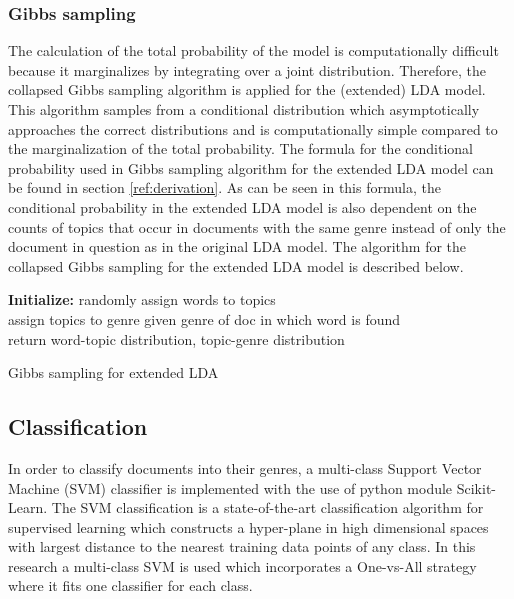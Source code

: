 \subsubsection{Gibbs sampling}
The calculation of the total probability of the model is computationally difficult because it marginalizes by integrating over a joint distribution. Therefore, the collapsed Gibbs sampling algorithm is applied for the (extended) LDA model. This algorithm samples from a conditional distribution which asymptotically approaches the correct distributions and is computationally simple compared to the marginalization of the total probability. The formula for the conditional probability used in Gibbs sampling algorithm for the extended LDA model can be found in section \ref{ref:derivation}. As can be seen in this formula, the conditional probability in the extended LDA model is also dependent on the counts of topics that occur in documents with the same genre instead of only the document in question as in the original LDA model. The algorithm for the collapsed Gibbs sampling for the extended LDA model is described below.

\begin{mdframed}
\begin{algorithm}[H]\label{alg:ext-lda}
\textbf{Initialize:} randomly assign words to topics \\
 assign topics to genre given genre of doc in which word is found\\
 return word-topic distribution, topic-genre distribution
 \caption{Gibbs sampling for extended LDA}
\end{algorithm}
\end{mdframed}

\subsection{Classification}\label{sub:classification}
In order to classify documents into their genres, a multi-class Support Vector Machine (SVM) classifier is implemented with the use of python module Scikit-Learn\cite{scikit-learn}. The SVM classification is a state-of-the-art classification algorithm for supervised learning which constructs a hyper-plane in high dimensional spaces with largest distance to the nearest training data points of any class. In this research a multi-class SVM is used which incorporates a One-vs-All strategy where it fits one classifier for each class.

